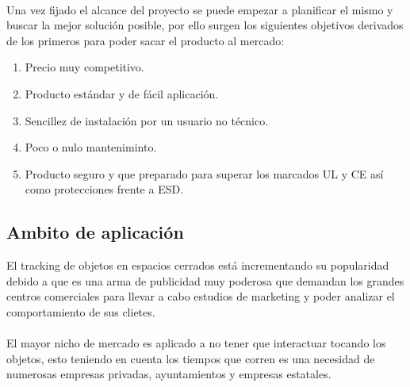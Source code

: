 \documentclass[paper=a4, fontsize=11pt,twoside]{scrartcl}	%
\begin{document}
        \paragraph{}
        Una vez fijado el alcance del proyecto se puede empezar a planificar el mismo y buscar la mejor solución 
        posible, por ello surgen los siguientes objetivos derivados de los primeros para poder sacar el producto 
        al mercado:
        \begin{enumerate}
            \item Precio muy competitivo.
            \item Producto estándar y de fácil aplicación.
            \item Sencillez de instalación por un usuario no técnico.
            \item Poco o nulo manteniminto.
            \item Producto seguro y que preparado para superar los marcados UL y CE así como protecciones frente a ESD.
        \end{enumerate}
    \subsection{Ambito de aplicación}
        El tracking de objetos en espacios cerrados está incrementando su popularidad debido a que es una 
        arma de publicidad muy poderosa que demandan los grandes centros comerciales para llevar a cabo estudios de marketing
        y poder analizar el comportamiento de sus clietes.
        \paragraph{}
        El mayor nicho de mercado es aplicado a no tener que interactuar tocando los objetos, 
        esto teniendo en cuenta los tiempos que corren es una necesidad de numerosas empresas privadas, ayuntamientos 
        y empresas estatales.
\end{document}
